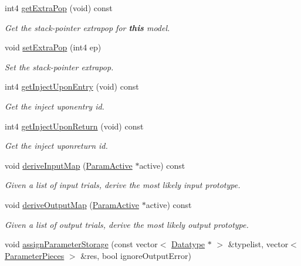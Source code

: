\begin{DoxyCompactItemize}
int4 \mbox{\hyperlink{class_proto_model_a640ae87320b6d6781639643057e61e1d}{get\+Extra\+Pop}} (void) const
\begin{DoxyCompactList}\small\item\em Get the stack-\/pointer {\itshape extrapop} for {\bfseries{this}} model. \end{DoxyCompactList}\item 
void \mbox{\hyperlink{class_proto_model_a42eb0adf6bb66f15bbbde19c02c931ca}{set\+Extra\+Pop}} (int4 ep)
\begin{DoxyCompactList}\small\item\em Set the stack-\/pointer {\itshape extrapop}. \end{DoxyCompactList}\item 
int4 \mbox{\hyperlink{class_proto_model_af505f8d493ab0dcefca9e94941c13658}{get\+Inject\+Upon\+Entry}} (void) const
\begin{DoxyCompactList}\small\item\em Get the inject {\itshape uponentry} id. \end{DoxyCompactList}\item 
int4 \mbox{\hyperlink{class_proto_model_a2e8994c68acebcf5c0278d86be39a530}{get\+Inject\+Upon\+Return}} (void) const
\begin{DoxyCompactList}\small\item\em Get the inject {\itshape uponreturn} id. \end{DoxyCompactList}\item 
void \mbox{\hyperlink{class_proto_model_a7f6da17343cb12b0e798fe7211441c58}{derive\+Input\+Map}} (\mbox{\hyperlink{class_param_active}{Param\+Active}} $\ast$active) const
\begin{DoxyCompactList}\small\item\em Given a list of input {\itshape trials}, derive the most likely input prototype. \end{DoxyCompactList}\item 
void \mbox{\hyperlink{class_proto_model_a463595607985ec774f3df35dfbd7ca94}{derive\+Output\+Map}} (\mbox{\hyperlink{class_param_active}{Param\+Active}} $\ast$active) const
\begin{DoxyCompactList}\small\item\em Given a list of output {\itshape trials}, derive the most likely output prototype. \end{DoxyCompactList}\item 
void \mbox{\hyperlink{class_proto_model_a5c32e533f079fc91875ccd486f70f36e}{assign\+Parameter\+Storage}} (const vector$<$ \mbox{\hyperlink{class_datatype}{Datatype}} $\ast$ $>$ \&typelist, vector$<$ \mbox{\hyperlink{struct_parameter_pieces}{Parameter\+Pieces}} $>$ \&res, bool ignore\+Output\+Error)

\end{DoxyCompactItemize}

